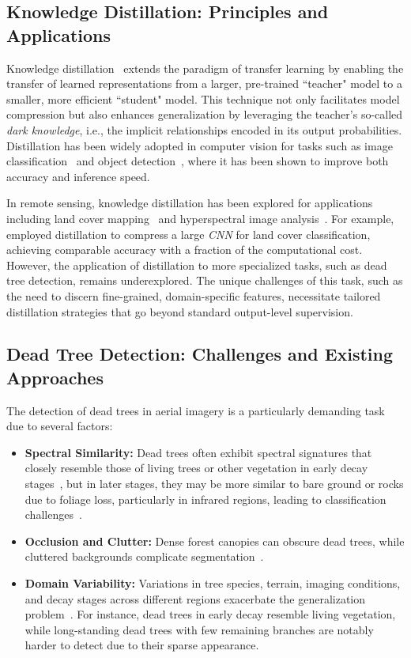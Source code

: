 \documentclass[twocolumn]{article}
\begin{document}
\subsection{Knowledge Distillation: Principles and Applications}

Knowledge distillation~\citep{hinton2015distilling} extends the paradigm of transfer learning by enabling the transfer of learned representations from a larger, pre-trained ``teacher" model to a smaller, more efficient ``student" model. This technique not only facilitates model compression but also enhances generalization by leveraging the teacher's so-called \textit{dark knowledge}, i.e., the implicit relationships encoded in its output probabilities. Distillation has been widely adopted in computer vision for tasks such as image classification~\citep{romero2014fitnets} and object detection~\citep{chen2017learning}, where it has been shown to improve both accuracy and inference speed.

In remote sensing, knowledge distillation has been explored for applications including land cover mapping~\citep{liu2019knowledge} and hyperspectral image analysis~\citep{wang2019domain}. For example, \cite{liu2019knowledge} employed distillation to compress a large \textit{CNN} for land cover classification, achieving comparable accuracy with a fraction of the computational cost. However, the application of distillation to more specialized tasks, such as dead tree detection, remains underexplored. The unique challenges of this task, such as the need to discern fine-grained, domain-specific features, necessitate tailored distillation strategies that go beyond standard output-level supervision.

\subsection{Dead Tree Detection: Challenges and Existing Approaches}

The detection of dead trees in aerial imagery is a particularly demanding task due to several factors:

\begin{itemize}
\item \textbf{Spectral Similarity:} Dead trees often exhibit spectral signatures that closely resemble those of living trees or other vegetation in early decay stages~\citep{meddens2011evaluating}, but in later stages, they may be more similar to bare ground or rocks due to foliage loss, particularly in infrared regions, leading to classification challenges~\citep{zielewska2020detection,liu2021mapping}.
\item \textbf{Occlusion and Clutter:} Dense forest canopies can obscure dead trees, while cluttered backgrounds complicate segmentation~\citep{dalponte2019individual}.
\item \textbf{Domain Variability:} Variations in tree species, terrain, imaging conditions, and decay stages across different regions exacerbate the generalization problem~\citep{fassnacht2014comparison}. For instance, dead trees in early decay resemble living vegetation, while long-standing dead trees with few remaining branches are notably harder to detect due to their sparse appearance.
\end{itemize}
\end{document}
